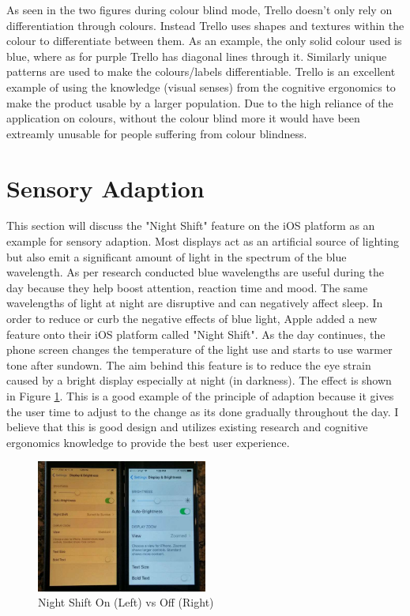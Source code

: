 \documentclass[12pt]{article}
\begin{document}
	As seen in the two figures during colour blind mode, Trello doesn't only rely on differentiation through colours. Instead Trello uses shapes and textures within the colour to differentiate between them. As an example, the only solid colour used is blue, where as for purple Trello has diagonal lines through it. Similarly unique patterns are used to make the colours/labels differentiable. Trello is an excellent example of using the knowledge (visual senses) from the cognitive ergonomics to make the product usable by a larger population. Due to the high reliance of the application on colours, without the colour blind more it would have been extreamly unusable for people suffering from colour blindness.
	
	\section{Sensory Adaption}
	This section will discuss the "Night Shift" feature on the iOS platform as an example for sensory adaption. Most displays act as an artificial source of lighting but also emit a significant amount of light in the spectrum of the blue wavelength. As per research conducted blue wavelengths are useful during the day because they help boost attention, reaction time and mood. The same wavelengths of light at night are disruptive and can negatively affect sleep. In order to reduce or curb the negative effects of blue light, Apple added a new feature onto their iOS platform called "Night Shift". As the day continues, the phone screen changes the temperature of the light use and starts to use warmer tone after sundown. The aim behind this feature is to reduce the eye strain caused by a bright display especially at night (in darkness). The effect is shown in Figure \ref{nightshift}. This is a good example of the principle of adaption because it gives the user time to adjust to the change as its done gradually throughout the day. I believe that this is good design and utilizes existing research and cognitive ergonomics knowledge to provide the best user experience.
	
	\begin{figure}[!ht]
		\centering
		\includegraphics[width=0.5\textwidth]{nightshift}
		\caption{Night Shift On (Left) vs Off (Right)}
		\label{nightshift}
	\end{figure}
	
\end{document}
